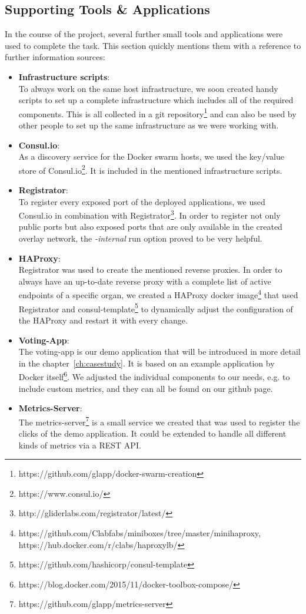 \documentclass{seal_thesis}
\begin{document}
\subsection{Supporting Tools \& Applications}
In the course of the project, several further small tools and applications were used to complete the task. This section quickly mentions them with a reference to further information sources:
\begin{itemize}
	\item \textbf{Infrastructure scripts}: \\
	To always work on the same host infrastructure, we soon created handy scripts to set up a complete infrastructure which includes all of the required components.
	This is all collected in a git repository\footnote{https://github.com/glapp/docker-swarm-creation} and can also be used by other people to set up the same infrastructure as we were working with.
	\item \textbf{Consul.io}: \\
	As a discovery service for the Docker swarm hosts, we used the key/value store of Consul.io\footnote{https://www.consul.io/}. It is included in the mentioned infrastructure scripts.
	\item \textbf{Registrator}: \\
	To register every exposed port of the deployed applications, we used Consul.io in combination with Registrator\footnote{http://gliderlabs.com/registrator/latest/}. In order to register not only public ports but also exposed ports that are only available in the created overlay network, the \textit{-internal} run option proved to be very helpful.
	\item \textbf{HAProxy}: \\
	Registrator was used to create the mentioned reverse proxies.
	In order to always have an up-to-date reverse proxy with a complete list of active endpoints of a specific organ, we created a HAProxy docker image\footnote{https://github.com/Clabfabs/miniboxes/tree/master/minihaproxy, https://hub.docker.com/r/clabs/haproxylb/} that used Registrator and consul-template\footnote{https://github.com/hashicorp/consul-template} to dynamically adjust the configuration of the HAProxy and restart it with every change.
	\item \textbf{Voting-App}: \\
	The voting-app is our demo application that will be introduced in more detail in the chapter~\ref{ch:casestudy}.
	It is based on an example application by Docker itself\footnote{https://blog.docker.com/2015/11/docker-toolbox-compose/}.
	We adjusted the individual components to our needs, e.g. to include custom metrics, and they can all be found on our github page.
	\item \textbf{Metrics-Server}: \\
	The metrics-server\footnote{https://github.com/glapp/metrics-server} is a small service we created that was used to register the clicks of the demo application.
	It could be extended to handle all different kinds of metrics via a REST API.
\end{itemize}
\end{document}
